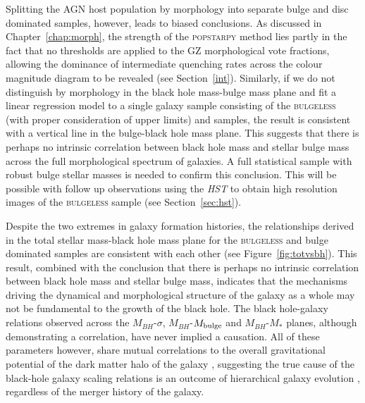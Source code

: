 {Splitting the AGN host population by morphology into separate bulge and disc dominated samples, however, leads to biased conclusions. As discussed in Chapter~\ref{chap:morph}, the strength of the \textsc{popstarpy} method lies partly in the fact that no thresholds are applied to the GZ morphological vote fractions, allowing the dominance of intermediate quenching rates across the colour magnitude diagram to be revealed (see Section~\ref{int}). Similarly, if we do not distinguish by morphology in the black hole mass-bulge mass plane and fit a linear regression model to a single galaxy sample consisting of the \textsc{bulgeless} (with proper consideration of upper limits) and \citet{haringrix04} samples, the result is consistent with a vertical line in the bulge-black hole mass plane. This suggests that there is perhaps no intrinsic correlation between black hole mass and stellar bulge mass across the full morphological spectrum of galaxies. A full statistical sample with robust bulge stellar masses is needed to confirm this conclusion. This will be possible with follow up observations using the \emph{HST} to obtain high resolution images of the \textsc{bulgeless} sample (see Section~\ref{sec:hst}). 

Despite the two extremes in galaxy formation histories, the relationships derived in the total stellar mass-black hole mass plane for the \textsc{bulgeless} and bulge dominated \citet{haringrix04} samples are consistent with each other (see Figure~\ref{fig:totvsbh}). This result, combined with the conclusion that there is perhaps no intrinsic correlation between black hole mass and stellar bulge mass, indicates that the mechanisms driving the dynamical and morphological structure of the galaxy as a whole may not be fundamental to the growth of the black hole. The black hole-galaxy relations observed across the $M_{BH}$-$\sigma$, $M_{BH}$-$M_{\rm{bulge}}$ and $M_{BH}$-$M_{*}$ planes, although demonstrating a correlation, have never implied a causation. All of these parameters however, share mutual correlations to the overall gravitational potential of the dark matter halo of the galaxy \citep{booth10, volonteri11}, suggesting the true cause of the black-hole galaxy scaling relations is an outcome of hierarchical galaxy evolution \citep{jahnke11}, regardless of the merger history of the galaxy. 

}
